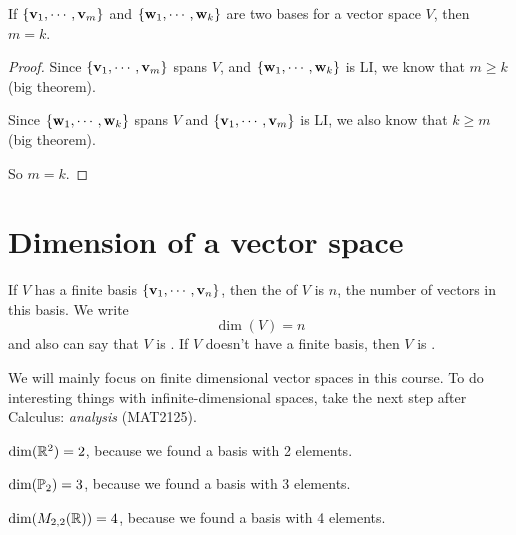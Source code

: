 \begin{theorem}  
If $\{\mathbf{v}_1, \cdots, \mathbf{v}_m\}$ and $\{\mathbf{w}_1,\cdots, \mathbf{w}_k\}$ are
two bases for a vector space $V$, then $m=k$.
\end{theorem}

\begin{proof}
Since  $\{\mathbf{v}_1, \cdots, \mathbf{v}_m\}$ spans $V$, and $\{\mathbf{w}_1,\cdots, \mathbf{w}_k\}$
is LI, we know that $m \geq k$ (big theorem).

Since  $\{\mathbf{w}_1,\cdots, \mathbf{w}_k\}$ spans $V$ and $\{\mathbf{v}_1, \cdots, \mathbf{v}_m\}$
is LI, we also know that $k \geq m$ (big theorem).

So $m=k$.
\end{proof}


\section{Dimension of a vector space}

\begin{definition}  If $V$ has a finite basis
$\{\mathbf{v}_1,\cdots, \mathbf{v}_n\}$, then the  of $V$ is
$n$, the number of vectors in this basis.  We write
$$
\dim(V) = n
$$
and also can say that $V$ is .  If $V$ 
doesn't have a finite basis, then $V$ is .
\end{definition}

\begin{remark} We will mainly focus on finite dimensional vector spaces in
this course.  To do interesting things with infinite-dimensional 
spaces, take the next step after Calculus: \emph{analysis} (MAT2125).
\end{remark}

\begin{myexample} $\dim(\mathbb{R}^2) = 2$, because we found a basis with 2 elements. \end{myexample}

\begin{myexample} $\dim(\mathbb{P}_2) = 3$, because we found a basis with 3 elements. \end{myexample}

\begin{myexample} $\dim(M_{2,2}(\mathbb{R})) = 4$, because we found a basis with 4 elements. \end{myexample}

